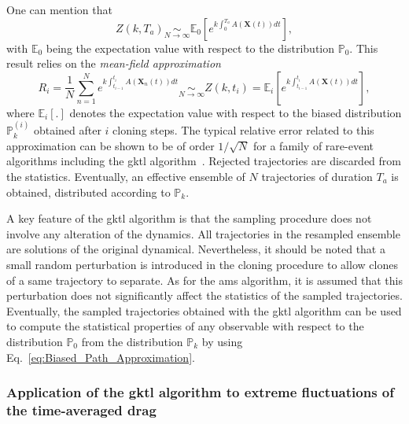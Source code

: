 \documentclass{jfm}
\begin{document}
%
One can mention that
\begin{equation}
  \label{eq:mean_field}
  Z(k,T_a) \underset{N\to \infty}{\sim} \mathbb{E}_0\left[e^{k\int_{0}^{T_{a}}A(\mathbf{X}(t))dt}\right],
\end{equation}
with $\mathbb{E}_{0}$ being the expectation value with respect to the
distribution $\mathbb{P}_{0}$.
This result relies on the \textit{mean-field approximation}
\begin{equation}
R_{i}=\frac{1}{N}\sum_{n=1}^{N}e^{k\int_{t_{i-1}}^{t_{i}}A(\mathbf{X}_{n}(t))dt}\underset{N\rightarrow\infty}{\sim} Z(k,t_i)= \mathbb{E}_{i}\left[e^{k\int_{t_{i-1}}^{t_{i}}A(\mathbf{X}(t))dt}\right],
\label{eq:Mean_Field_Approximation}
\end{equation}
where $\mathbb{E}_{i}[.]$ denotes the expectation value with respect to the biased distribution $\mathbb{P}_k^{(i)}$ obtained after $i$ cloning steps.
The typical relative error related to this approximation can be shown to be of order $1/\sqrt{N}$ for a family of rare-event algorithms including the \ac{gktl} algorithm~\citep{DelMoralBook,DelMoral2013}.
%
Rejected trajectories are discarded from the statistics.
Eventually, an effective ensemble of $N$ trajectories of duration $T_{a}$ is obtained, distributed according to $\mathbb{P}_{k}$.

A key feature of the \ac{gktl} algorithm is that the sampling procedure does not involve any alteration of the dynamics. All trajectories in the resampled ensemble are solutions of the original dynamical. 
{Nevertheless, it should be noted that a small random perturbation is introduced in the cloning procedure to allow clones of a same trajectory to separate. 
As for the \ac{ams} algorithm, it is assumed that this perturbation does not significantly affect the statistics of the sampled trajectories.}
% 
%
%
Eventually, the sampled trajectories obtained with the \ac{gktl} algorithm can be used to compute the statistical properties of any observable with respect to the distribution $\mathbb{P}_{0}$ from the distribution $\mathbb{P}_{k}$ by using Eq.~\eqref{eq:Biased_Path_Approximation}.
%


\subsubsection{Application of the \ac{gktl} algorithm to extreme fluctuations of the time-averaged drag}
\label{sec:gktl_drag}
\end{document}
